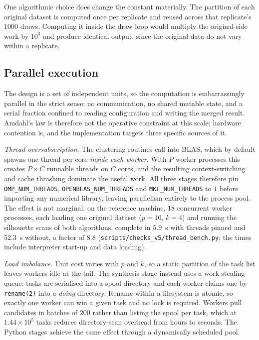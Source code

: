 \documentclass[pdflatex,referee]{sn-jnl}
\begin{document}
One algorithmic choice does change the constant materially. The partition of
each original dataset is computed once per replicate and reused across that
replicate's $1000$ draws. Computing it inside the draw loop would multiply the
original-side work by $10^{3}$ and produce identical output, since the original
data do not vary within a replicate.

\subsection{Parallel execution}

The design is a set of independent units, so the computation is
embarrassingly parallel in the strict sense: no communication, no shared mutable
state, and a serial fraction confined to reading configuration and writing the
merged result. Amdahl's law is therefore not the operative constraint at this
scale; hardware contention is, and the implementation targets three specific
sources of it.

\emph{Thread oversubscription.} The clustering routines call into BLAS, which by
default spawns one thread per core \emph{inside each worker}. With $P$ worker
processes this creates $P \times C$ runnable threads on $C$ cores, and the
resulting context-switching and cache thrashing dominate the useful work. All
three stages therefore pin \texttt{OMP\_NUM\_THREADS},
\texttt{OPENBLAS\_NUM\_THREADS} and \texttt{MKL\_NUM\_THREADS} to $1$ before
importing any numerical library, leaving parallelism entirely to the process
pool. The effect is not marginal: on the reference machine, $18$ concurrent
worker processes, each loading one original dataset ($p = 10$, $k = 4$) and
running the silhouette scans of both algorithms, complete in $5.9$~s with
threads pinned and $52.3$~s without, a factor of $8.8$
(\texttt{scripts/checks\_v5/thread\_bench.py}; the times include interpreter
start-up and data loading).

\emph{Load imbalance.} Unit cost varies with $p$ and $k$, so a static partition
of the task list leaves workers idle at the tail. The synthesis stage instead
uses a work-stealing queue: tasks are serialised into a spool directory and each
worker claims one by \texttt{rename(2)} into a \emph{doing} directory. Rename
within a filesystem is atomic, so exactly one worker can win a given task and no
lock is required. Workers pull candidates in batches of $200$ rather than
listing the spool per task, which at $1.44 \times 10^{5}$ tasks reduces
directory-scan overhead from hours to seconds. The Python stages achieve the
same effect through a dynamically scheduled pool.
\end{document}
